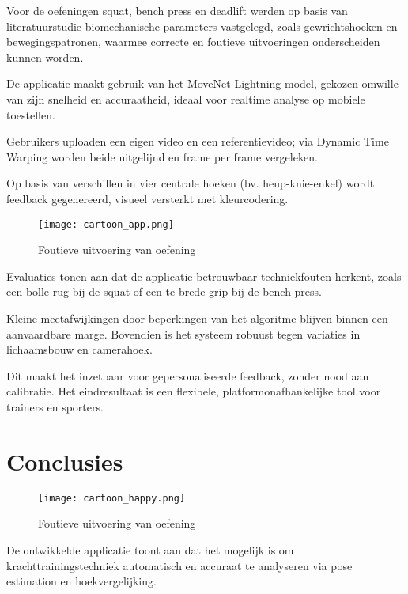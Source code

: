 \documentclass[a0,portrait]{hogent-poster}
\begin{document}
\begin{multicols}{2}
 Voor de oefeningen squat, bench press en deadlift werden op basis van literatuurstudie biomechanische parameters vastgelegd, zoals gewrichtshoeken en bewegingspatronen, waarmee correcte en foutieve uitvoeringen onderscheiden kunnen worden. 

 De applicatie maakt gebruik van het MoveNet Lightning-model, gekozen omwille van zijn snelheid en accuraatheid, ideaal voor realtime analyse op mobiele toestellen. 

 Gebruikers uploaden een eigen video en een referentievideo; via Dynamic Time Warping worden beide uitgelijnd en frame per frame vergeleken. 

 Op basis van verschillen in vier centrale hoeken (bv. heup-knie-enkel) wordt feedback gegenereerd, visueel versterkt met kleurcodering. 

 \vspace{1em}

\begin{figure}[H]
  \centering
  \texttt{[image: cartoon\_app.png]}
  \caption*{Foutieve uitvoering van oefening}
  \vspace{1em}
\end{figure}

 Evaluaties tonen aan dat de applicatie betrouwbaar techniekfouten herkent, zoals een bolle rug bij de squat of een te brede grip bij de bench press. 

 Kleine meetafwijkingen door beperkingen van het algoritme blijven binnen een aanvaardbare marge. Bovendien is het systeem robuust tegen variaties in lichaamsbouw en camerahoek.

 Dit maakt het inzetbaar voor gepersonaliseerde feedback, zonder nood aan calibratie. Het eindresultaat is een flexibele, platformonafhankelijke tool voor trainers en sporters.

\section{Conclusies}

\begin{figure}[H]
  \centering
  \texttt{[image: cartoon\_happy.png]}
  \caption*{Foutieve uitvoering van oefening}
  \vspace{1em}
\end{figure}
 
De ontwikkelde applicatie toont aan dat het mogelijk is om krachttrainingstechniek automatisch en accuraat te analyseren via pose estimation en hoekvergelijking. 


\end{multicols}
\end{document}
